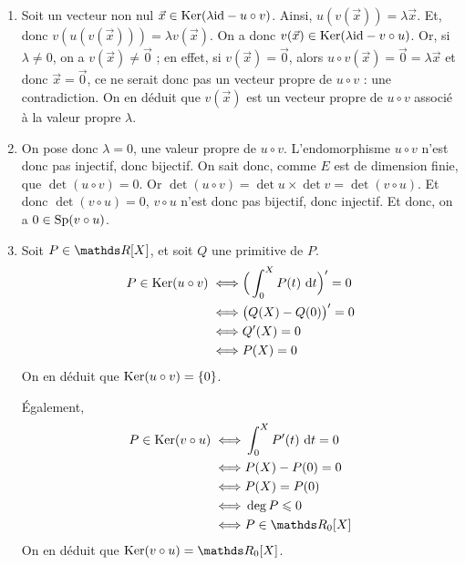 \begin{enumerate}
	\item Soit un vecteur non nul $\vec{x} \in \operatorname{Ker}(\lambda {\operatorname{id}} - {u \circ v})$. Ainsi, $u(v(\vec{x})) = \lambda \vec{x}$. Et, donc $v(u(v(\vec{x}))) = \lambda v(\vec{x})$. On a donc $v(\vec{x}) \in \operatorname{Ker}(\lambda {\operatorname{id}} - {v  \circ u})$.
		Or, si $\lambda \neq 0$, on a $v(\vec{x}) \neq \vec{0}$\/ ; en effet, si $v(\vec{x}) = \vec{0}$, alors $u \circ v(\vec{x}) = \vec{0} = \lambda \vec{x}$\/ et donc $\vec{x} = \vec{0}$, ce ne serait donc pas un vecteur propre de $u \circ v$\/ : une contradiction. On en déduit que $v(\vec{x})$\/ est un vecteur propre de $u \circ v$\/ associé à la valeur propre $\lambda$.
	\item On pose donc $\lambda = 0$, une valeur propre de $u  \circ v$. L'endomorphisme $u \circ v$\/ n'est donc pas injectif, donc bijectif. On sait donc, comme $E$\/ est de dimension finie, que $\det(u \circ v) = 0$. Or $\det (u \circ v) = \det u \times \det v = \det(v  \circ u)$. Et donc $\det(v  \circ u) = 0$, $v  \circ u$\/ n'est donc pas bijectif, donc injectif. Et donc, on a $0 \in \operatorname{Sp}(v  \circ u)$.
	\item Soit $P \in \R[X]$, et soit $Q$\/ une primitive de $P$.
		\begin{align*}
			P \in \operatorname{Ker} (u  \circ v) \iff& \Big(\int_{0}^X P(t)~\mathrm{d}t\Big)' = 0\\
			\iff& \big(Q(X) - Q(0)\big)' = 0\\
			\iff& Q'(X) = 0\\
			\iff& P(X) = 0
		\end{align*}
		On en déduit que $\operatorname{Ker} (u \circ v) = \{0\}$.

		Également,
		\begin{align*}
			P \in \Ker(v  \circ u) \iff& \int_{0}^{X} P'(t)~\mathrm{d}t = 0\\
			\iff& P(X) - P(0) = 0\\
			\iff& P(X) = P(0)\\
			\iff& \deg P \le 0\\
			\iff& P \in \R_0[X]
		\end{align*}
		On en déduit que $\Ker(v \circ u) = \R_0[X]$.
\end{enumerate}

